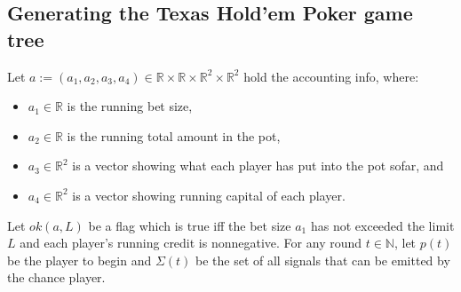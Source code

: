 \documentclass[a4paper,9pt,journal]{IEEEtran}
\begin{document}
\subsection{Generating the Texas Hold'em Poker game tree}
Let $a := (a_1, a_2, a_3, a_4) \in 
\mathbb{R}\times\mathbb{R}\times\mathbb{R}^2\times\mathbb{R}^2$ hold the accounting info, where:
\begin{itemize}
\item $a_1\in\mathbb{R}$ is the running bet size,
\item $a_2\in\mathbb{R}$ is the running total amount in the pot,
\item $a_3\in\mathbb{R}^2$ is a vector showing what each player has put into the pot sofar, and
\item $a_4\in\mathbb{R}^2$ is a vector showing running capital of each player.
\end{itemize}
Let $ok(a, L)$ be a flag which is true iff the bet size $a_1$ has not exceeded the limit $L$ and each player's running credit is nonnegative.
For any round $t\in\mathbb{N}$, let $p(t)$ be the player to begin and $\Sigma(t)$ be the set of all signals that can be emitted by the chance player.
\end{document}
